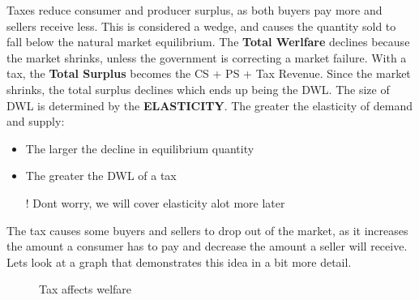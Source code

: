  Taxes reduce consumer and producer surplus, as both buyers pay more and sellers receive less. This is considered a wedge, and causes the quantity sold to fall below the natural market equilibrium. The \textbf{Total Werlfare} declines because the market shrinks, unless the government is correcting a market failure. 
 With a tax, the \textbf{Total Surplus} becomes the CS + PS + Tax Revenue. Since the market shrinks, the total surplus declines which ends up being the DWL. The size of DWL is determined by the \textbf{ELASTICITY}. 
 The greater the elasticity of demand and supply:
\begin{itemize}
    \item The larger the decline in equilibrium quantity
    \item The greater the DWL of a tax
    \item[!] Dont worry, we will cover elasticity alot more later
\end{itemize}

The tax causes some buyers and sellers to drop out of the market, as it increases the amount a consumer has to pay and decrease the amount a seller will receive. Lets look at a graph that demonstrates this idea in a bit more detail. 

\begin{figure}[H]
\begin{center}
\caption{Tax affects welfare}
\label{fig:welfare}
\end{center}
\end{figure}

